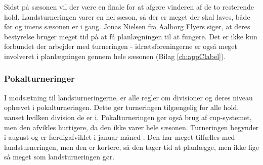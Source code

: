 Sidst på sæsonen vil der være en finale for at afgøre vinderen af de to resterende hold. Landsturneringen varer en hel sæson, så der er meget der skal laves, både før og imens sæsonen er i gang. Jonas Nielsen fra Aalborg Flyers siger, at deres bestyrelse bruger meget tid på at få planlægningen til at fungere. Det er ikke kun forbundet der arbejder med turneringen - idrætsforeningerne er også meget involveret i planlægningen gennem hele sæsonen (Bilag \ref{ch:appClabel}). %

\subsubsection{Pokalturneringer}
I modsætning til landsturneringerne, er alle regler om divisioner og deres niveau ophævet i pokalturneringen. Dette gør turneringen tilgængelig for alle hold, uanset hvilken division de er i. Pokalturneringen gør også brug af cup-systemet, men den afvikles hurtigere, da den ikke varer hele sæsonen. Turneringen begynder i august og er færdigafviklet i januar måned \cite{Pokalturnering}. Den har meget tilfælles med landsturneringen, men den er kortere, så den tager tid at planlægge, men ikke lige så meget som landsturneringen gør.

